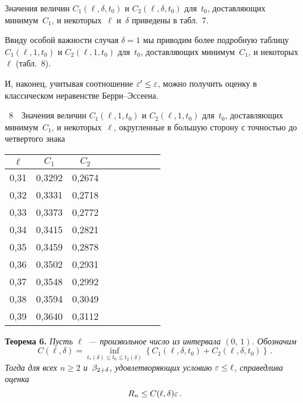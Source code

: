 \begin{multicols}{2}
\smallskip

Значения величин $C_1(\ell, \delta, t_0)$ и $C_2(\ell,\delta,t_0)$ для~$t_0$, доставляющих минимум~$C_1$,
и некоторых~$\ell$ и~$\delta$ приведены в табл.~7.


Ввиду особой важности случая $\delta=1$ мы приводим более подробную таблицу $C_1(\ell,1,t_0)$
и $C_2(\ell,1,t_0)$ для~$t_0$, доставляющих минимум~$C_1$, и некоторых~$\ell$ (табл.~8).


И, наконец, учитывая соотношение $\varepsilon'\le\varepsilon$, можно получить
оценку в классическом неравенстве Берри--Эссеена.

\noindent %
\begin{center}
\parbox{60mm}{{\tablename~8}\ \ \small{Значения величин $C_1(\ell,1,t_0)$ и $C_2(\ell,1,t_0)$ для~$t_0$, доставляющих минимум~$C_1$, и
некоторых~$\ell$, округленные в б$\acute{\mbox{о}}$льшую сторону с точностью до четвертого знака}}
\end{center}

{\small
\begin{center}
\tabcolsep=17pt
\begin{tabular}{|c|c|c|c|c|c|c|c|c|}
\hline
$\ell$&$C_1$&$C_2$\\
\hline
0,31  & 0,3292  & 0,2674  \\
0,32  & 0,3331  & 0,2718  \\
0,33  & 0,3373  & 0,2772  \\
0,34  & 0,3415  & 0,2821  \\
0,35  & 0,3459  & 0,2878  \\
0,36  & 0,3502  & 0,2931  \\
0,37  & 0,3548  & 0,2992  \\
0,38  & 0,3594  & 0,3049  \\
0,39  & 0,3640  & 0,3112  \\
 \hline
\end{tabular}
\end{center}
}


\addtocounter{table}{1}


\noindent
\textbf{Теорема 6.}
\textit{Пусть $\ell$~--- произвольное число из интервала $(0,\,1)$. Обозначим
$$
C(\ell,\delta)=\inf_{t_*(\delta)\le t_0\le
t_2(\delta)}\left\{C_1(\ell,\delta,t_0)+ C_2(\ell,\delta,t_0)\right\}\,.
$$
Тогда для всех ${n\ge2}$ и~$\beta_{2+\delta}$, удовлетворяющих условию
${\varepsilon\le \ell}$, справедлива оценка
$$
R_n\le C(\ell,\delta)\varepsilon\,.
$$
}




\end{multicols}
